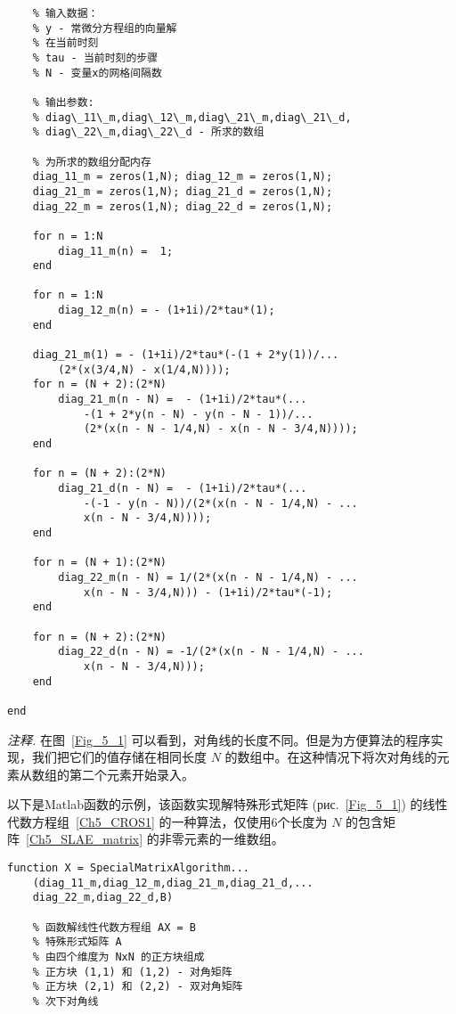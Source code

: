 \documentclass[twoside]{book}
\begin{document}
\begin{CJK*}{GBK}{song}
\begin{lstlisting}
    % 输入数据：
    % y - 常微分方程组的向量解
    % 在当前时刻
    % tau - 当前时刻的步骤
    % N - 变量x的网格间隔数

    % 输出参数:
    % diag\_11\_m,diag\_12\_m,diag\_21\_m,diag\_21\_d,
    % diag\_22\_m,diag\_22\_d - 所求的数组

    % 为所求的数组分配内存
    diag_11_m = zeros(1,N); diag_12_m = zeros(1,N);
    diag_21_m = zeros(1,N); diag_21_d = zeros(1,N);
    diag_22_m = zeros(1,N); diag_22_d = zeros(1,N);

    for n = 1:N
        diag_11_m(n) =  1;
    end

    for n = 1:N
        diag_12_m(n) = - (1+1i)/2*tau*(1);
    end

    diag_21_m(1) = - (1+1i)/2*tau*(-(1 + 2*y(1))/...
        (2*(x(3/4,N) - x(1/4,N))));
    for n = (N + 2):(2*N)
        diag_21_m(n - N) =  - (1+1i)/2*tau*(...
            -(1 + 2*y(n - N) - y(n - N - 1))/...
            (2*(x(n - N - 1/4,N) - x(n - N - 3/4,N))));
    end

    for n = (N + 2):(2*N)
        diag_21_d(n - N) =  - (1+1i)/2*tau*(...
            -(-1 - y(n - N))/(2*(x(n - N - 1/4,N) - ...
            x(n - N - 3/4,N))));
    end

    for n = (N + 1):(2*N)
        diag_22_m(n - N) = 1/(2*(x(n - N - 1/4,N) - ...
            x(n - N - 3/4,N))) - (1+1i)/2*tau*(-1);
    end

    for n = (N + 2):(2*N)
        diag_22_d(n - N) = -1/(2*(x(n - N - 1/4,N) - ...
            x(n - N - 3/4,N)));
    end

end
\end{lstlisting}

\emph{注释.} 在图~\ref{Fig_5_1} 可以看到，对角线的长度不同。但是为方便算法的程序实现，我们把它们的值存储在相同长度 $N$ 的数组中。在这种情况下将次对角线的元素从数组的第二个元素开始录入。


以下是Matlab函数的示例，该函数实现解特殊形式矩阵 (рис.~\ref{Fig_5_1}) 的线性代数方程组~\eqref{Ch5_CROS1} 的一种算法，仅使用6个长度为 $N$ 的包含矩阵~\eqref{Ch5_SLAE_matrix} 的非零元素的一维数组。
%
\begin{lstlisting}
function X = SpecialMatrixAlgorithm...
    (diag_11_m,diag_12_m,diag_21_m,diag_21_d,...
    diag_22_m,diag_22_d,B)

    % 函数解线性代数方程组 AX = B
    % 特殊形式矩阵 A
    % 由四个维度为 NxN 的正方块组成
    % 正方块 (1,1) 和 (1,2) - 对角矩阵
    % 正方块 (2,1) 和 (2,2) - 双对角矩阵
    % 次下对角线


\end{lstlisting}
\end{CJK*}
\end{document}
